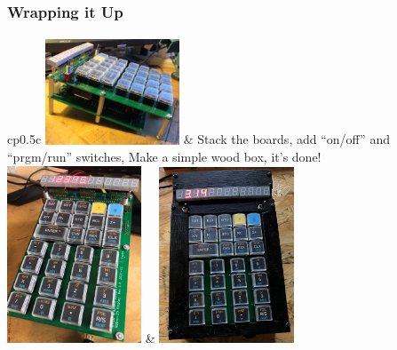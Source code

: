 \documentclass{beamer}
\begin{document}
\begin{frame}
  \frametitle{Wrapping it Up}
  \framesubtitle{}
  \begin{tabular}{cp{}{c}}
    \raisebox{-0.6\height}
      {\includegraphics[width=0.3\textwidth]{figs/side_view.jpg}} &
    \scriptsize
    Stack the boards, add ``on/off'' and ``prgm/run'' switches,
    Make a simple wood box, it's done!
    \\
    \includegraphics[width=0.3\textwidth]{figs/display-board.jpg} &
    \includegraphics[width=0.3\textwidth]{figs/box_view.jpg} \\
  \end{tabular}
\end{frame}
\end{document}
